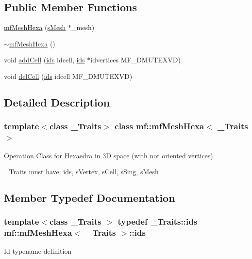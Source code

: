 \subsection*{Public Member Functions}
\begin{DoxyCompactItemize}
\item 
\hyperlink{classmf_1_1mfMeshHexa_adb23c1c168b7d84af3029306fe621711}{mfMeshHexa} (\hyperlink{classmf_1_1mfMeshHexa_adc5f7c62030d948caf1f04a255f385de}{sMesh} $\ast$\_\-mesh)
\item 
\hyperlink{classmf_1_1mfMeshHexa_ae0dc24a89e171a408e4e5ebe91c31132}{$\sim$mfMeshHexa} ()
\item 
void \hyperlink{classmf_1_1mfMeshHexa_ad9b87bd8f3042eb791dfbb41403fc2e3}{addCell} (\hyperlink{classmf_1_1mfMeshHexa_ab95eac5745c5efd075cf732421c40d94}{ids} idcell, \hyperlink{classmf_1_1mfMeshHexa_ab95eac5745c5efd075cf732421c40d94}{ids} $\ast$idvertices MF\_\-DMUTEXVD)
\item 
void \hyperlink{classmf_1_1mfMeshHexa_aa1edfd7f7763a08e0bd9f86065e3a8bd}{delCell} (\hyperlink{classmf_1_1mfMeshHexa_ab95eac5745c5efd075cf732421c40d94}{ids} idcell MF\_\-DMUTEXVD)
\end{DoxyCompactItemize}


\subsection{Detailed Description}
\subsubsection*{template$<$class \_\-Traits$>$ class mf::mfMeshHexa$<$ \_\-Traits $>$}

Operation Class for Hexaedra in 3D space (with not oriented vertices)

\_\-Traits must have: ids, sVertex, sCell, sSing, sMesh 

\subsection{Member Typedef Documentation}
\hypertarget{classmf_1_1mfMeshHexa_ab95eac5745c5efd075cf732421c40d94}{
\subsubsection[{ids}]{\setlength{\rightskip}{0pt plus 5cm}template$<$class \_\-Traits $>$ typedef \_\-Traits::ids {\bf mf::mfMeshHexa}$<$ \_\-Traits $>$::{\bf ids}}}
\label{classmf_1_1mfMeshHexa_ab95eac5745c5efd075cf732421c40d94}
Id typename definition 

